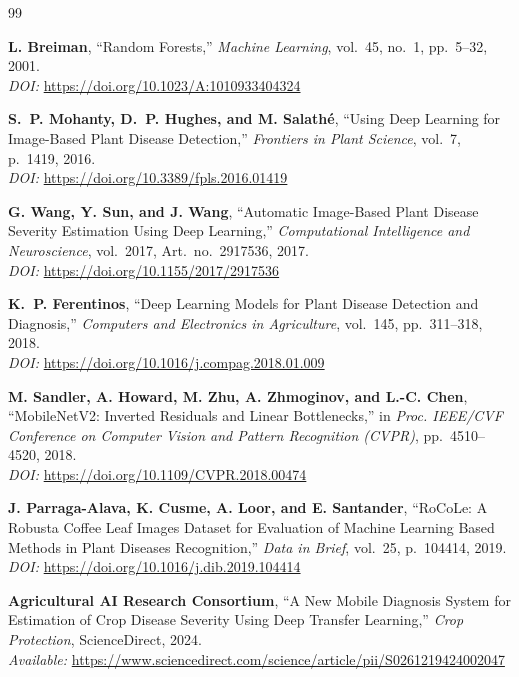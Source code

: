 \documentclass[a4paper,12pt,twoside]{report}
\numberwithin{equation}{section}
\begin{document}
\begin{thebibliography}{99}
\small

\textbf{L. Breiman}, ``Random Forests,'' \textit{Machine Learning}, vol.~45, no.~1, pp.~5--32, 2001.\\
\textit{DOI:} \url{https://doi.org/10.1023/A:1010933404324}

\textbf{S.~P. Mohanty, D.~P. Hughes, and M. Salath\'{e}}, ``Using Deep Learning for Image-Based Plant Disease Detection,'' \textit{Frontiers in Plant Science}, vol.~7, p.~1419, 2016.\\
\textit{DOI:} \url{https://doi.org/10.3389/fpls.2016.01419}

\textbf{G. Wang, Y. Sun, and J. Wang}, ``Automatic Image-Based Plant Disease Severity Estimation Using Deep Learning,'' \textit{Computational Intelligence and Neuroscience}, vol.~2017, Art.~no.~2917536, 2017.\\
\textit{DOI:} \url{https://doi.org/10.1155/2017/2917536}

\textbf{K.~P. Ferentinos}, ``Deep Learning Models for Plant Disease Detection and Diagnosis,'' \textit{Computers and Electronics in Agriculture}, vol.~145, pp.~311--318, 2018.\\
\textit{DOI:} \url{https://doi.org/10.1016/j.compag.2018.01.009}

\textbf{M. Sandler, A. Howard, M. Zhu, A. Zhmoginov, and L.-C. Chen}, ``MobileNetV2: Inverted Residuals and Linear Bottlenecks,'' in \textit{Proc. IEEE/CVF Conference on Computer Vision and Pattern Recognition (CVPR)}, pp.~4510--4520, 2018.\\
\textit{DOI:} \url{https://doi.org/10.1109/CVPR.2018.00474}

\textbf{J. Parraga-Alava, K. Cusme, A. Loor, and E. Santander}, ``RoCoLe: A Robusta Coffee Leaf Images Dataset for Evaluation of Machine Learning Based Methods in Plant Diseases Recognition,'' \textit{Data in Brief}, vol.~25, p.~104414, 2019.\\
\textit{DOI:} \url{https://doi.org/10.1016/j.dib.2019.104414}

\textbf{Agricultural AI Research Consortium}, ``A New Mobile Diagnosis System for Estimation of Crop Disease Severity Using Deep Transfer Learning,'' \textit{Crop Protection}, ScienceDirect, 2024.\\
\textit{Available:} \url{https://www.sciencedirect.com/science/article/pii/S0261219424002047}


\end{thebibliography}
\end{document}

